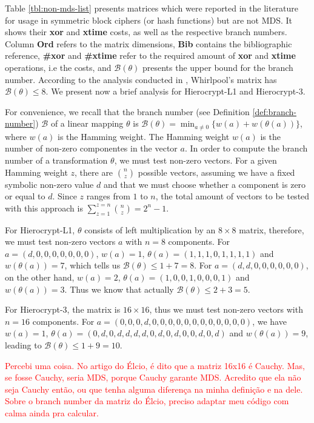 Table \ref{tbl:non-mds-list} presents matrices which were reported in the literature for usage in symmetric block ciphers (or hash functions) but are not MDS. It shows their \textbf{xor} and \textbf{xtime} costs, as well as the respective branch numbers. Column \textbf{Ord} refers to the matrix dimensions, \textbf{Bib} contains the bibliographic reference, \textbf{\#xor} and \textbf{\#xtime} refer to the required amount of \textbf{xor} and \textbf{xtime} operations, i.e the costs, and \textbf{$\mathcal{B}(\theta)$} presents the upper bound for the branch number. According to the analysis conducted in \cite{Shirai2003}, Whirlpool's matrix has $\mathcal{B}(\theta) \leq 8$. We present now a brief analysis for Hierocrypt-L1 and Hierocrypt-3.

For convenience, we recall that the branch number (see Definition \ref{def:branch-number}) $\mathcal{B}$ of a linear mapping $\theta$ is $\mathcal{B}(\theta) = \min_{a\neq0}\{w(a) + w(\theta(a))\}$, where $w(a)$ is the Hamming weight. The Hamming weight $w(a)$ is the number of non-zero componentes in the vector $a$. In order to compute the branch number of a transformation $\theta$, we must test non-zero vectors. For a given Hamming weight $z$, there are $\binom{n}{z}$ possible vectors, assuming we have a fixed symbolic non-zero value $d$ and that we must choose whether a component is zero or equal to $d$. Since $z$ ranges from $1$ to $n$, the total amount of vectors to be tested with this approach is $\sum_{z=1}^{z=n}\binom{n}{z} = 2^n-1$.

For Hierocrypt-L1, $\theta$ consists of left multiplication by an $8\times8$ matrix, therefore, we must test non-zero vectors $a$ with $n=8$ components. For $a = (d, 0, 0, 0, 0, 0, 0, 0)$, $w(a) = 1$, $\theta(a) = (1,1,1,0,1,1,1,1)$ and $w(\theta(a)) = 7$, which tells us $\mathcal{B}(\theta) \leq 1+7 = 8$. For $a = (d, d, 0, 0, 0, 0, 0, 0)$, on the other hand, $w(a) = 2$, $\theta(a) = (1, 0, 0, 1, 0, 0, 0, 1)$ and $w(\theta(a)) = 3$. Thus we know that actually $\mathcal{B}(\theta) \leq 2+3 = 5$.

For Hierocrypt-3, the matrix is $16\times16$, thus we must test non-zero vectors with $n=16$ components. For $a= (0, 0, 0, d, 0, 0, 0, 0, 0, 0, 0, 0, 0, 0, 0, 0)$, we have $w(a) = 1$, $\theta(a) = (0,d,0,d,d,d,d,0,d,0,d,0,0,d,0,d)$ and $w(\theta(a)) = 9$, leading to $\mathcal{B}(\theta) \leq 1+9 = 10$.

\textcolor{red}{Percebi uma coisa. No artigo do Élcio, é dito que a matriz 16x16 é Cauchy. Mas, se fosse Cauchy, seria MDS, porque Cauchy garante MDS. Acredito que ela não seja Cauchy então, ou que tenha alguma diferença na minha definição e na dele. Sobre o branch number da matriz do Élcio, preciso adaptar meu código com calma ainda pra calcular.}

